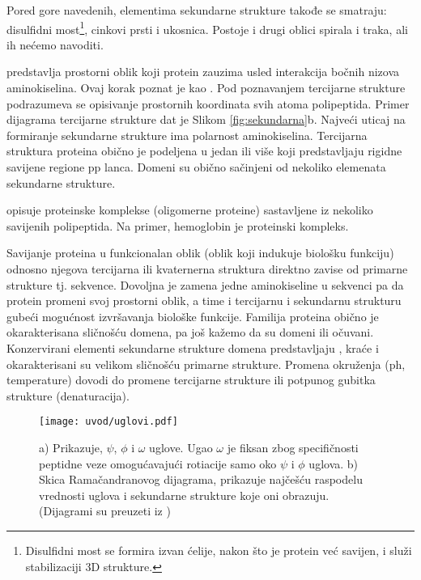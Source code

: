 Pored gore navedenih, elementima sekundarne strukture takođe se smatraju:
disulfidni most\footnote{
  Disulfidni most se formira izvan ćelije, nakon što je protein  već savijen, i
  služi stabilizaciji 3D strukture.
},
cinkovi prsti i ukosnica.  Postoje i drugi oblici spirala i traka, ali ih
nećemo navoditi.




 predstavlja prostorni oblik koji protein zauzima
usled interakcija bočnih nizova aminokiselina. Ovaj korak poznat je kao
 .  Pod poznavanjem tercijarne strukture 
podrazumeva se opisivanje prostornih koordinata svih atoma polipeptida. Primer dijagrama
tercijarne strukture dat je Slikom \ref{fig:sekundarna}b.
Najveći uticaj na formiranje sekundarne strukture ima polarnost aminokiselina.
Tercijarna struktura proteina obično je podeljena u jedan ili više
 koji predstavljaju rigidne savijene regione pp lanca.  Domeni
su obično sačinjeni od nekoliko elemenata sekundarne strukture.

 opisuje proteinske komplekse (oligomerne proteine) sastavljene
iz nekoliko savijenih polipeptida. Na primer, hemoglobin je proteinski kompleks.

Savijanje proteina u funkcionalan oblik (oblik koji indukuje biološku funkciju)
odnosno njegova tercijarna ili kvaternerna struktura direktno zavise od
primarne strukture tj. sekvence. Dovoljna je zamena jedne aminokiseline u sekvenci
pa da protein promeni svoj prostorni oblik, a time i tercijarnu i sekundarnu strukturu
gubeći mogućnost izvršavanja biološke funkcije. Familija proteina obično je
okarakterisana sličnošću domena, pa još kažemo da su domeni
 ili očuvani.  Konzervirani elementi sekundarne strukture
domena predstavljaju , kraće  i
okarakterisani su velikom sličnošću primarne strukture. Promena okruženja (ph,
temperature) dovodi do promene tercijarne strukture ili potpunog gubitka
strukture (denaturacija).


\begin{figure}[th]
\centering
\texttt{[image: uvod/uglovi.pdf]}
\caption {
  \footnotesize
  a) Prikazuje, $\psi$, $\phi$ i $\omega$ uglove. Ugao $\omega$ je fiksan
  zbog specifičnosti peptidne veze omogućavajući rotiacije samo oko
  $\psi$ i $\phi$ uglova.
  b) Skica Ramačandranovog dijagrama, prikazuje najčešću raspodelu vrednosti uglova
  i sekundarne strukture koje oni obrazuju.
  (Dijagrami su preuzeti iz \cite{Bioinformatics2007})
}
\label{fig:uglovi}
\end{figure}


